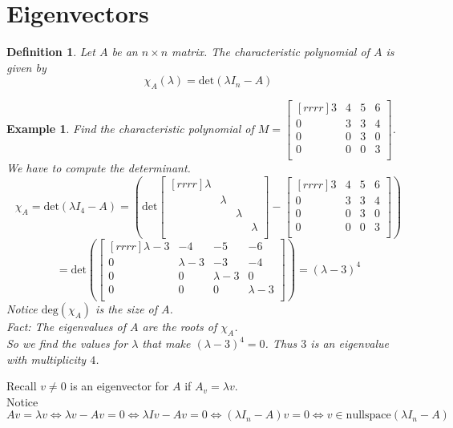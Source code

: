 \documentclass{report}
\newtheorem*{ex}{Example}
\newtheorem*{defn}{Definition}
\begin{document}
\section{Eigenvectors}
\begin{defn}
Let $A$ be an $n \times n$ matrix. The characteristic polynomial of $A$ is given by
\[ \chi_A(\lambda)=\mathrm{det}(\lambda I_n-A) \]
\end{defn}
\begin{ex}
Find the characteristic polynomial of $M=\begin{bmatrix}[rrrr]3&4&5&6\\0&3&3&4\\0&0&3&0\\0&0&0&3\\\end{bmatrix}$.\\
We have to compute the determinant.
\[ \chi_A =\mathrm{det}(\lambda I_4-A)=\left (\mathrm{det}\begin{bmatrix}[rrrr]\lambda&{}&{}&{}\\{}&\lambda&{}&{}\\{}&{}&\lambda&{}\\{}&{}&{}&\lambda\\\end{bmatrix}-\begin{bmatrix}[rrrr]3&4&5&6\\0&3&3&4\\0&0&3&0\\0&0&0&3\\\end{bmatrix} \right )\]
\[ = \mathrm{det}\left (\begin{bmatrix}[rrrr]\lambda - 3& -4 & -5 & -6\\0 & \lambda - 3& -3 & -4\\0&0&\lambda - 3 & 0\\0&0&0&\lambda - 3\\\end{bmatrix}\right ) = (\lambda - 3)^4 \]
Notice $\mathrm{deg}(\chi_A)$ is the size of $A$.\\
Fact: The eigenvalues of $A$ are the roots of $\chi_A$.\\
So we find the values for $\lambda$ that make $(\lambda - 3)^4 = 0$. Thus $3$ is an eigenvalue with multiplicity $4$.
\end{ex}

Recall $v\neq 0$ is an eigenvector for $A$ if $A_v=\lambda v$.\\
Notice $Av=\lambda v \iff \lambda v - Av = 0 \iff \lambda Iv - Av = 0 \iff (\lambda I_n-A)v = 0 \iff v\in \mathrm{nullspace}(\lambda I_n-A)$
\end{document}
